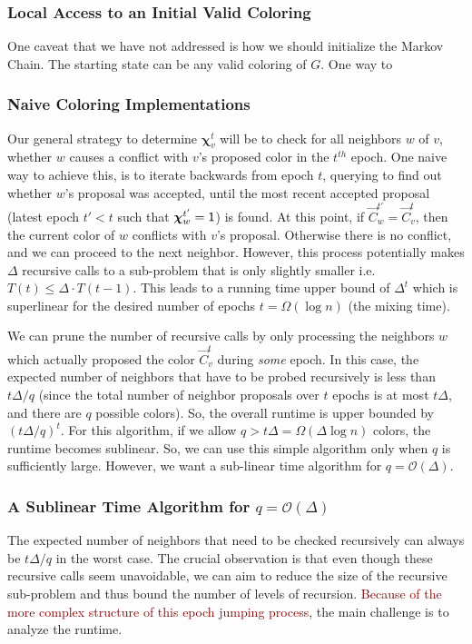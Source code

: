 \subsubsection{Local Access to an Initial Valid Coloring}
\label{sec:local_access_to_an_initial_valid_coloring}
One caveat that we have not addressed is how we should initialize the Markov Chain.
The starting state can be any valid coloring of $G$.
One way to

\subsubsection{Naive Coloring Implementations}%
\label{sec:naive_coloring_implementations}
Our general strategy to determine $\bm\chi^t_v$ will be to check for all neighbors $w$ of $v$,
whether $w$ causes a conflict with $v$'s proposed color in the $t^{th}$ epoch.
One naive way to achieve this, is to iterate backwards from epoch $t$, querying to find out whether $w$'s proposal was accepted,
until the most recent accepted proposal (latest epoch $t' < t$ such that $\bm\chi^{t'}_w=\mathsf{1}$) is found.
At this point, if $\vec C^{t'}_w =\vec C^t_v$, then the current color of $w$ conflicts with $v$'s proposal.
Otherwise there is no conflict, and we can proceed to the next neighbor.
However, this process potentially makes $\Delta$ recursive calls to a sub-problem that is only slightly smaller i.e. $T(t) \le \Delta\cdot T(t-1)$.
This leads to a running time upper bound of $\Delta^{t}$ which is superlinear for the desired number of epochs $t = \Omega(\log n)$ (the mixing time).

We can prune the number of recursive calls by only processing the neighbors $w$ which actually proposed the color $\vec C^t_v$ during \emph{some} epoch.
In this case, the expected number of neighbors that have to be probed recursively is less than $t\Delta/q$
(since the total number of neighbor proposals over $t$ epochs is at most $t\Delta$, and there are $q$ possible colors).
So, the overall runtime is upper bounded by $(t\Delta/q)^{t}$.
For this algorithm, if we allow $q > t\Delta = \Omega(\Delta\log n)$ colors, the runtime becomes sublinear.
So, we can use this simple algorithm only when $q$ is sufficiently large.
However, we want a sub-linear time algorithm for $q = \mathcal O(\Delta)$.


\subsubsection{A Sublinear Time Algorithm for $q = \mathcal O(\Delta)$}
\label{sec:jumping_back_to_past_epochs}
The expected number of neighbors that need to be checked recursively can always be $t\Delta/q$ in the worst case.
The crucial observation is that even though these recursive calls seem unavoidable,
we can aim to reduce the size of the recursive sub-problem and thus bound the number of levels of recursion.
\textcolor{Maroon}{Because of the more complex structure of this epoch jumping process}, the main challenge is to analyze the runtime.

